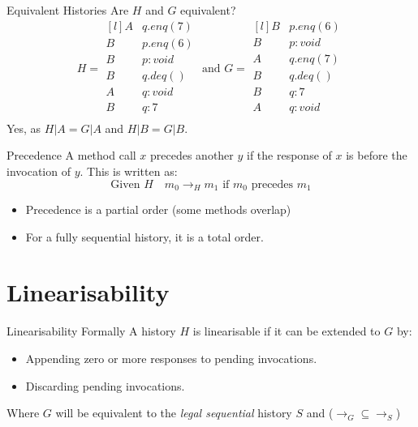 \begin{examplebox}{Equivalent Histories}
	Are $H$ and $G$ equivalent?
	\[H = \begin{matrix*}[l]
			A & q.enq(7) \\
			B & p.enq(6) \\
			B & p : void \\
			B & q.deq() \\
			A & q: void \\
			B & q: 7 \\
		\end{matrix*} \text{ and } G = \begin{matrix*}[l]
			B & p.enq(6) \\
			B & p : void \\
			A & q.enq(7) \\
			B & q.deq() \\
			B & q: 7 \\
			A & q: void \\
		\end{matrix*}\]
	\tcblower
	Yes, as $H|A = G|A$ and $H|B = G|B$.
\end{examplebox}
\begin{definitionbox}{Precedence}
	A method call $x$ precedes another $y$ if the response of $x$ is before the invocation of $y$. This is written as:
	\[\text{Given } H \quad m_0 \to_H m_1 \text{ if }m_0 \text{ precedes }m_1\]
	\begin{itemize}
		\item Precedence is a partial order (some methods overlap)
		\item For a fully sequential history, it is a total order.
	\end{itemize}
\end{definitionbox}


\section{Linearisability}
\begin{definitionbox}{Linearisability Formally}
	A history $H$ is linearisable if it can be extended to $G$ by:
	\begin{itemize}
		\item Appending zero or more responses to pending invocations.
		\item Discarding pending invocations.
	\end{itemize}
	Where $G$ will be equivalent to the \textit{legal sequential} history $S$ and ($\to_G \subseteq \to_S$)
\end{definitionbox}

